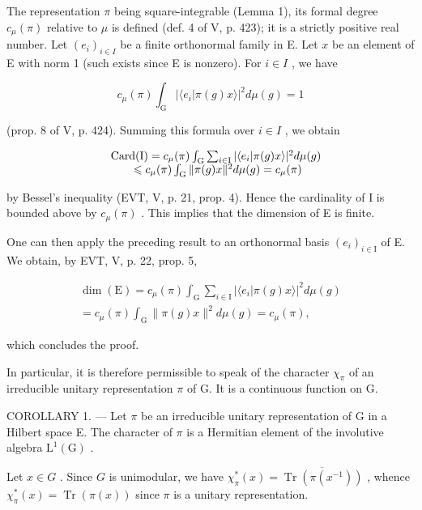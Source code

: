 The representation \(\pi\) being square-integrable (Lemma 1), its formal degree \(c_{\mu}(\pi)\) relative to \(\mu\) is defined (def. 4 of V, p. 423); it is a strictly positive real number. Let \((e_i)_{i \in I}\) be a finite orthonormal family in E. Let \(x\) be an element of E with norm 1 (such exists since E is nonzero). For \(i \in I\) , we have

\[
c _ {\mu} (\pi) \int_ {\mathrm{G}} | \langle e _ {i} | \pi (g) x \rangle | ^ {2} d \mu (g) = 1
\]

(prop. 8 of V, p. 424). Summing this formula over \(i \in I\) , we obtain

\[
\begin{array}{r l} & {\mathrm{Card(I)} = c _ {\mu} (\pi) \int_ {\mathrm{G}} \sum_ {i \in \mathrm{I}} | \langle e _ {i} | \pi (g) x \rangle | ^ {2} d \mu (g)} \\ & {\qquad \leqslant c _ {\mu} (\pi) \int_ {\mathrm{G}} \| \pi (g) x \| ^ {2} d \mu (g) = c _ {\mu} (\pi)} \end{array}
\]

by Bessel's inequality (EVT, V, p. 21, prop. 4). Hence the cardinality of I is bounded above by \(c_{\mu}(\pi)\) . This implies that the dimension of E is finite.

One can then apply the preceding result to an orthonormal basis \((e_{i})_{i\in\mathrm{I}}\) of E. We obtain, by EVT, V, p. 22, prop. 5,

\[
\begin{array}{r} \dim (\mathrm{E}) = c _ {\mu} (\pi) \int_ {\mathrm{G}} \sum_ {i \in \mathrm{I}} | \langle e _ {i} | \pi (g) x \rangle | ^ {2} d \mu (g) \\ = c _ {\mu} (\pi) \int_ {\mathrm{G}} \| \pi (g) x \| ^ {2} d \mu (g) = c _ {\mu} (\pi), \end{array}
\]

which concludes the proof.

In particular, it is therefore permissible to speak of the character \(\chi_{\pi}\) of an irreducible unitary representation \(\pi\) of G. It is a continuous function on G.

COROLLARY 1. --- Let \(\pi\) be an irreducible unitary representation of G in a Hilbert space E. The character of \(\pi\) is a Hermitian element of the involutive algebra \(\mathrm{L}^{1}(\mathrm{G})\) .

Let \(x \in G\) . Since \(G\) is unimodular, we have \(\chi_{\pi}^{*}(x) = \overline{\operatorname{Tr}(\pi(x^{-1}))}\) , whence \(\chi_{\pi}^{*}(x) = \operatorname{Tr}(\pi(x))\) since \(\pi\) is a unitary representation.

